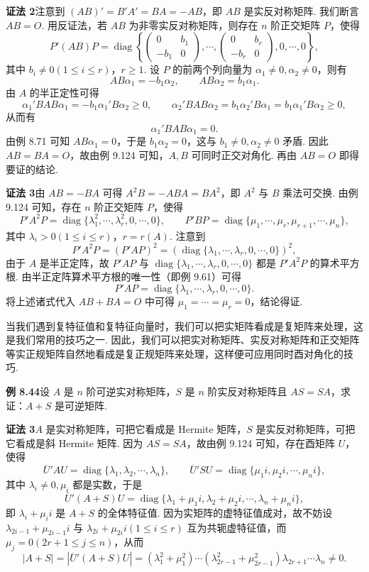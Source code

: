 \documentclass[UTF8,12pt,a4paper,fontset=fandol]{ctexart}
\begin{document}
\noindent\textbf{证法 2}\quad 注意到 $(AB)'=B'A'=BA=-AB$，即 $AB$ 是实反对称矩阵. 我们断言 $AB=O$. 用反证法，若 $AB$ 为非零实反对称矩阵，则存在 $n$ 阶正交矩阵 $P$，使得
\[
P'(AB)P=\operatorname{diag}\left\{
\begin{pmatrix}
0&b_1\\
-b_1&0
\end{pmatrix},\cdots,
\begin{pmatrix}
0&b_r\\
-b_r&0
\end{pmatrix},
0,\cdots,0
\right\},
\]
其中 $b_i\ne0(1\le i\le r)$，$r\ge1$. 设 $P$ 的前两个列向量为 $\alpha_1\ne0,\alpha_2\ne0$，则有
\[
AB\alpha_1=-b_1\alpha_2,\qquad AB\alpha_2=b_1\alpha_1.
\]
由 $A$ 的半正定性可得
\[
\alpha_1'BAB\alpha_1=-b_1\alpha_1'B\alpha_2\ge0,\qquad
\alpha_2'BAB\alpha_2=b_1\alpha_2'B\alpha_1=b_1\alpha_1'B\alpha_2\ge0,
\]
从而有
\[
\alpha_1'BAB\alpha_1=0.
\]
由例 8.71 可知 $AB\alpha_1=0$，于是 $b_1\alpha_2=0$，这与 $b_1\ne0,\alpha_2\ne0$ 矛盾. 因此 $AB=BA=O$，故由例 9.124 可知，$A,B$ 可同时正交对角化. 再由 $AB=O$ 即得要证的结论.

\noindent\textbf{证法 3}\quad 由 $AB=-BA$ 可得 $A^2B=-ABA=BA^2$，即 $A^2$ 与 $B$ 乘法可交换. 由例 9.124 可知，存在 $n$ 阶正交矩阵 $P$，使得
\[
P'A^2P=\operatorname{diag}\{\lambda_1^2,\cdots,\lambda_r^2,0,\cdots,0\},\qquad
P'BP=\operatorname{diag}\{\mu_1,\cdots,\mu_r,\mu_{r+1},\cdots,\mu_n\},
\]
其中 $\lambda_i>0(1\le i\le r)$，$r=r(A)$. 注意到
\[
P'A^2P=(P'AP)^2=(\operatorname{diag}\{\lambda_1,\cdots,\lambda_r,0,\cdots,0\})^2,
\]
由于 $A$ 是半正定阵，故 $P'AP$ 与 $\operatorname{diag}\{\lambda_1,\cdots,\lambda_r,0,\cdots,0\}$ 都是 $P'A^2P$ 的算术平方根. 由半正定阵算术平方根的唯一性（即例 9.61）可得
\[
P'AP=\operatorname{diag}\{\lambda_1,\cdots,\lambda_r,0,\cdots,0\}.
\]
将上述诸式代入 $AB+BA=O$ 中可得 $\mu_1=\cdots=\mu_r=0$，结论得证.

当我们遇到复特征值和复特征向量时，我们可以把实矩阵看成是复矩阵来处理，这是我们常用的技巧之一. 因此，我们可以把实对称矩阵、实反对称矩阵和正交矩阵等实正规矩阵自然地看成是复正规矩阵来处理，这样便可应用同时酉对角化的技巧.

\noindent\textbf{例 8.44}\quad 设 $A$ 是 $n$ 阶可逆实对称矩阵，$S$ 是 $n$ 阶实反对称矩阵且 $AS=SA$，求证：$A+S$ 是可逆矩阵.

\noindent\textbf{证法 3}\quad $A$ 是实对称矩阵，可把它看成是 Hermite 矩阵，$S$ 是实反对称矩阵，可把它看成是斜 Hermite 矩阵. 因为 $AS=SA$，故由例 9.124 可知，存在酉矩阵 $U$，使得
\[
\overline{U}'AU=\operatorname{diag}\{\lambda_1,\lambda_2,\cdots,\lambda_n\},\qquad
\overline{U}'SU=\operatorname{diag}\{\mu_1i,\mu_2i,\cdots,\mu_ni\},
\]
其中 $\lambda_i\ne0,\mu_i$ 都是实数，于是
\[
\overline{U}'(A+S)U=\operatorname{diag}\{\lambda_1+\mu_1i,\lambda_2+\mu_2i,\cdots,\lambda_n+\mu_ni\},
\]
即 $\lambda_i+\mu_ii$ 是 $A+S$ 的全体特征值. 因为实矩阵的虚特征值成对，故不妨设 $\lambda_{2i-1}+\mu_{2i-1}i$ 与 $\lambda_{2i}+\mu_{2i}i(1\le i\le r)$ 互为共轭虚特征值，而 $\mu_j=0(2r+1\le j\le n)$，从而
\[
|A+S|=|\overline{U}'(A+S)U|=(\lambda_1^2+\mu_1^2)\cdots(\lambda_{2r-1}^2+\mu_{2r-1}^2)\lambda_{2r+1}\cdots\lambda_n\ne0.
\]
\end{document}
